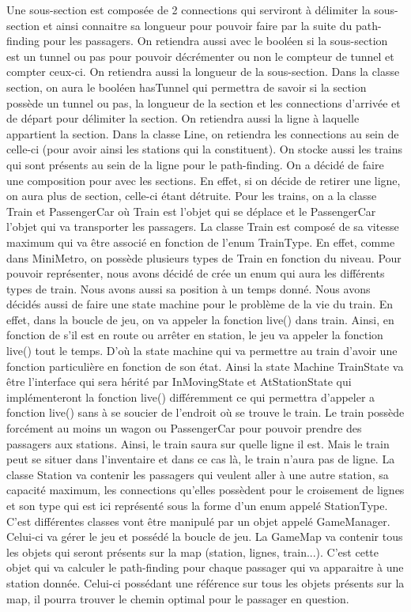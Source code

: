 \documentclass[report, backcover, french, nodocumentinfo]{upmethodology-document}
\begin{document}
			Une sous-section est composée de 2 connections qui serviront à délimiter la sous-section et ainsi connaitre sa longueur pour pouvoir faire par la suite du path-finding pour les passagers. On retiendra aussi avec le booléen si la sous-section est un tunnel ou pas pour pouvoir décrémenter ou non le compteur de tunnel et compter ceux-ci. On retiendra aussi la longueur de la sous-section. 
			Dans la classe section, on aura le booléen hasTunnel qui permettra de savoir si la section possède un tunnel ou pas, la longueur de la section et les connections d'arrivée et de départ pour délimiter la section. On retiendra aussi  la ligne à laquelle appartient la section.
			Dans la classe Line, on retiendra les connections au sein de celle-ci (pour avoir ainsi les stations qui la constituent). On stocke aussi les trains qui sont présents au sein de la ligne pour le path-finding. On a décidé de faire une composition pour avec les sections. En effet, si on décide de retirer une ligne, on aura plus de section, celle-ci étant détruite.
			\p{}
			Pour les trains, on a la classe Train et PassengerCar où Train est l'objet qui se déplace et le PassengerCar l'objet qui va transporter les passagers. La classe Train est composé de sa vitesse maximum qui va être associé en fonction de l'enum TrainType. En effet, comme dans MiniMetro, on possède plusieurs types de Train en fonction du niveau. Pour pouvoir représenter, nous avons décidé de crée un enum qui aura les différents types de train. Nous avons aussi sa position à un temps donné. Nous avons décidés aussi de faire une state machine pour le problème de la vie du train. En effet, dans la boucle de jeu, on va appeler la fonction live() dans train. Ainsi, en fonction de s'il est en route ou arrêter en station, le jeu va appeler la fonction live() tout le temps. D'où la state machine qui va permettre au train d'avoir une fonction particulière en fonction de son état. Ainsi la state Machine TrainState va être l'interface qui sera hérité par InMovingState et AtStationState qui implémenteront la fonction live() différemment ce qui permettra d'appeler a fonction live() sans à se soucier de l'endroit où se trouve le train. Le train possède forcément au moins un wagon ou PassengerCar pour pouvoir prendre des passagers aux stations. Ainsi, le train saura sur quelle ligne il est. Mais le train peut se situer dans l'inventaire et dans ce cas là, le train n'aura pas de ligne.
			\p{}
			La classe Station va contenir les passagers qui veulent aller à une autre station, sa capacité maximum, les connections qu'elles possèdent pour le croisement de lignes et son type qui est ici représenté sous la forme d'un enum appelé StationType.
			\p{}
			C'est différentes classes vont être manipulé par un objet appelé GameManager. Celui-ci va gérer le jeu et possédé la boucle de jeu. La GameMap va contenir tous les objets qui seront présents sur la map (station, lignes, train...). C'est cette objet qui va calculer le path-finding pour chaque passager qui va apparaitre à une station donnée. Celui-ci possédant une référence sur tous les objets présents sur la map, il pourra trouver le chemin optimal pour le passager en question.
\end{document}
